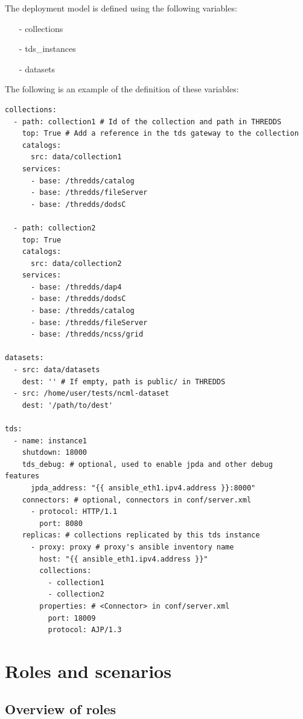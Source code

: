 \documentclass[a4paper,12pt]{article}
\begin{document}
The deployment model is defined using the following variables:

\begin{itemize}
\item[-] collections
\item[-] tds\_instances
\item[-] datasets
\end{itemize}

The following is an example of the definition of these variables:

\begin{lstlisting}
collections:
  - path: collection1 # Id of the collection and path in THREDDS
    top: True # Add a reference in the tds gateway to the collection
    catalogs:
      src: data/collection1
    services: 
      - base: /thredds/catalog
      - base: /thredds/fileServer
      - base: /thredds/dodsC

  - path: collection2
    top: True
    catalogs:
      src: data/collection2
    services:
      - base: /thredds/dap4
      - base: /thredds/dodsC
      - base: /thredds/catalog
      - base: /thredds/fileServer
      - base: /thredds/ncss/grid

datasets:
  - src: data/datasets
    dest: '' # If empty, path is public/ in THREDDS
  - src: /home/user/tests/ncml-dataset
    dest: '/path/to/dest'

tds:
  - name: instance1
    shutdown: 18000
    tds_debug: # optional, used to enable jpda and other debug features
      jpda_address: "{{ ansible_eth1.ipv4.address }}:8000"
    connectors: # optional, connectors in conf/server.xml
      - protocol: HTTP/1.1
        port: 8080
    replicas: # collections replicated by this tds instance
      - proxy: proxy # proxy's ansible inventory name 
        host: "{{ ansible_eth1.ipv4.address }}" 
        collections: 
          - collection1
          - collection2
        properties: # <Connector> in conf/server.xml
          port: 18009
          protocol: AJP/1.3
\end{lstlisting}

\section{Roles and scenarios}

\subsection{Overview of roles}
\end{document}
